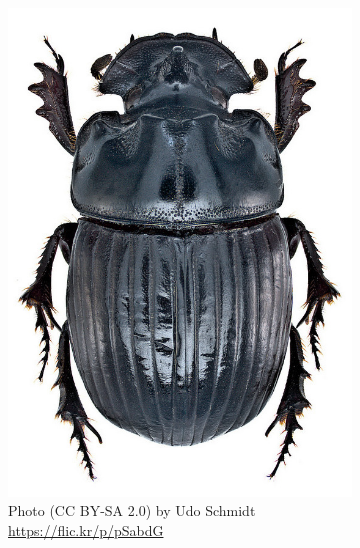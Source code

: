 \documentclass[letterpaper, 11pt]{article}
\begin{document}
\begin{figure}[ht!]
  \centering
\begin{subfigure}[ht!]{0.25\textwidth}
    \includegraphics[width=\textwidth]{ScarabHabitus1}
  \caption{Photo (CC BY-SA 2.0) by Udo Schmidt \url{https://flic.kr/p/pSabdG}}
  \label{fig:scarabaeid1}
\end{subfigure}
    ~
\begin{subfigure}[ht!]{0.25\textwidth}

\end{subfigure}
\end{figure}
\end{document}
